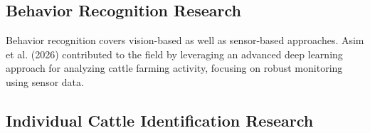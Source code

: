 \subsection{Behavior Recognition Research}

Behavior recognition covers vision-based as well as sensor-based approaches. Asim et al. (2026) \cite{asim2026s260} contributed to the field by leveraging an advanced deep learning approach for analyzing cattle farming activity, focusing on robust monitoring using sensor data.

\begin{table}[H]
\centering
\caption{Summary of Behavior Recognition Papers}
\label{tab:behavior_papers}
\end{table}

\subsection{Individual Cattle Identification Research}

